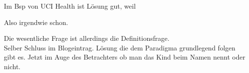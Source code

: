 \documentclass[twoside,twocolumn]{article}
\begin{document}
Im Bsp von UCI Health ist Lösung gut, weil \cite{src1}\cite{ss2} 

Also irgendwie schon.


Die wesentliche Frage ist allerdings die Definitionsfrage.\\
Selber Schluss im Blogeintrag. Lösung die dem Paradigma grundlegend folgen gibt es. Jetzt im Auge des Betrachters ob man das Kind beim Namen nennt oder nicht.










\end{document}

